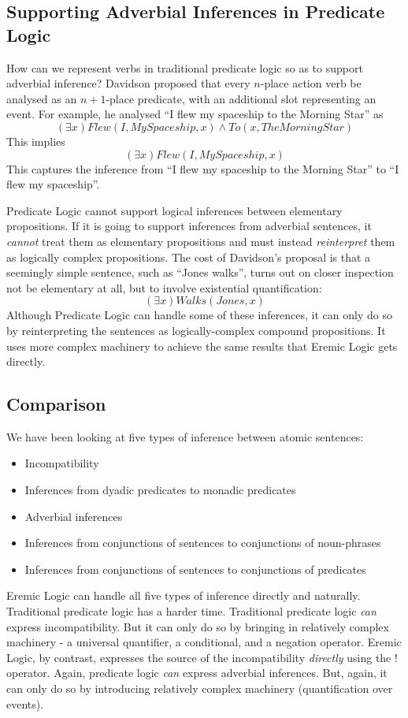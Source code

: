 \subsection{Supporting Adverbial Inferences in Predicate Logic}
How can we represent verbs in traditional predicate logic so as to support adverbial inference?
Davidson \cite{davidson2} proposed that every $n$-place action verb be analysed as an $n+1$-place predicate, with an additional slot representing an event.
For example, he  analysed ``I flew my spaceship to the Morning Star'' as 
\[
(\exists x) Flew(I, MySpaceship, x) \land To(x, TheMorningStar)
\]
This implies 
\[
(\exists x) Flew(I, MySpaceship, x)
\]
This captures the inference from ``I flew my spaceship to the Morning Star'' to ``I flew my spaceship''.

Predicate Logic cannot support logical inferences between elementary propositions. 
If it is going to support inferences from adverbial sentences, it \emph{cannot} treat them as elementary propositions and must instead \emph{reinterpret} them as logically complex propositions.
The cost of Davidson's proposal is that a seemingly simple sentence, such as ``Jones walks'', turns out on closer inspection not be elementary at all,  but to involve existential quantification:
\[
(\exists x) Walks(Jones, x)
\]
Although Predicate Logic can handle some of these inferences, it can only do so by reinterpreting the sentences as logically-complex compound propositions. 
It uses more complex machinery to achieve the same results that Eremic Logic gets directly.

\subsection{Comparison}
We have been looking at five types of inference between atomic sentences:
\begin{itemize}
\item
Incompatibility
\item
Inferences from dyadic predicates to monadic predicates
\item
Adverbial inferences
\item
Inferences from conjunctions of sentences to conjunctions of noun-phrases
\item
Inferences from conjunctions of sentences to conjunctions of predicates
\end{itemize}
Eremic Logic can handle all five types of inference directly and naturally.
Traditional predicate logic has a harder time.
Traditional predicate logic \emph{can} express incompatibility. But it can only do so by bringing in relatively complex machinery - a universal quantifier, a conditional, and a negation operator. Eremic Logic, by contrast, expresses the source of the incompatibility \emph{directly} using the $!$ operator.
Again, predicate logic \emph{can} express adverbial inferences. But, again, it can only do so by introducing relatively complex machinery (quantification over events). 

